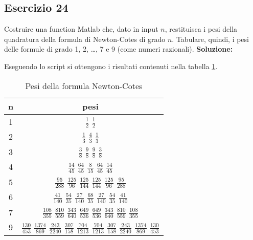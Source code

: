 \subsection{Esercizio 24}
Costruire una function Matlab che, dato in input $n$, restituisca i pesi della quadratura
della formula di Newton-Cotes di grado $n$. Tabulare, quindi, i pesi delle formule di grado
1, 2, \dots, 7 e 9 (come numeri razionali).
\newline \textbf{Soluzione:}


Eseguendo lo script  si ottengono i risultati contenuti nella tabella \ref{tab:24}.
\begin{table}[ht]
    \centering
    \renewcommand\arraystretch{2}
    \begin{tabular}{| c | c |}
        \hline
        n & pesi                                                                                                                                                                                      \\
        \hline
        1 & $\frac{1}{2}$ $\frac{1}{2}$                                                                                                                                                               \\
        2 & $\frac{1}{3}$ $\frac{4}{3}$ $\frac{1}{3}$                                                                                                                                                 \\
        3 & $\frac{3}{8}$ $\frac{9}{8}$ $\frac{9}{8}$ $\frac{3}{8}$                                                                                                                                   \\
        4 & $\frac{14}{45}$ $\frac{64}{45}$ $\frac{8}{15}$ $\frac{64}{45}$ $\frac{14}{45}$                                                                                                            \\
        5 & $\frac{95}{288}$ $\frac{125}{96}$ $\frac{125}{144}$ $\frac{125}{144}$ $\frac{125}{96}$ $\frac{95}{288}$                                                                                   \\
        6 & $\frac{41}{140}$ $\frac{54}{35}$ $\frac{27}{140}$ $\frac{68}{35}$ $\frac{27}{140}$ $\frac{54}{35}$ $\frac{41}{140}$                                                                       \\
        7 & $\frac{108}{355}$ $\frac{810}{559}$ $\frac{343}{640}$ $\frac{649}{536}$ $\frac{649}{536}$ $\frac{343}{640}$ $\frac{810}{559}$ $\frac{108}{355}$                                           \\
        9 & $\frac{130}{453}$ $\frac{1374}{869}$ $\frac{243}{2240}$ $\frac{307}{158}$ $\frac{704}{1213}$ $\frac{704}{1213}$ $\frac{307}{158}$ $\frac{243}{2240}$ $\frac{1374}{869}$ $\frac{130}{453}$ \\
        \hline
    \end{tabular}
    \caption{Pesi della formula Newton-Cotes}
    \label{tab:24}
\end{table}
\FloatBarrier

